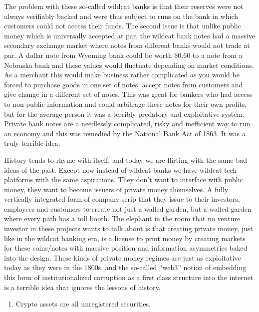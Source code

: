 \documentclass[
]{book}
\providecommand{\tightlist}{%
  \setlength{\itemsep}{0pt}\setlength{\parskip}{0pt}}
\begin{document}
The problem with these so-called wildcat banks is that their reserves were not always verifiably backed and were thus subject to runs on the bank in which customers could not access their funds. The second issue is that unlike public money which is universally accepted at par, the wildcat bank notes had a massive secondary exchange market where notes from different banks would not trade at par. A dollar note from Wyoming bank could be worth \$0.60 to a note from a Nebraska bank and these values would fluctuate depending on market conditions. As a merchant this would make business rather complicated as you would be forced to purchase goods in one set of notes, accept notes from customers and give change in a different set of notes. This was great for bankers who had access to non-public information and could arbitrage these notes for their own profits, but for the average person it was a terribly predatory and exploitative system. Private bank notes are a needlessly complicated, risky and inefficient way to run an economy and this was remedied by the National Bank Act of 1863. It was a truly terrible idea.

History tends to rhyme with itself, and today we are flirting with the same bad ideas of the past. Except now instead of wildcat banks we have wildcat tech platforms with the same aspirations. They don't want to interface with public money, they want to become issuers of private money themselves. A fully vertically integrated form of company scrip that they issue to their investors, employees and customers to create not just a walled garden, but a walled garden where every path has a toll booth. The elephant in the room that no venture investor in these projects wants to talk about is that creating private money, just like in the wildcat banking era, is a license to print money by creating markets for these coins/notes with massive position and information asymmetries baked into the design. These kinds of private money regimes are just as exploitative today as they were in the 1800s, and the so-called ``web3'' notion of embedding this form of institutionalized corruption as a first class structure into the internet is a terrible idea that ignores the lessons of history.

\begin{enumerate}
\def\labelenumi{\arabic{enumi}.}
\setcounter{enumi}{3}
\tightlist
\item
  Crypto assets are all unregistered securities.
\end{enumerate}
\end{document}
